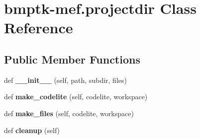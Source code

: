 \hypertarget{classbmptk-mef_1_1projectdir}{}\section{bmptk-\/mef.projectdir Class Reference}
\label{classbmptk-mef_1_1projectdir}
\subsection*{Public Member Functions}
\begin{DoxyCompactItemize}
\item 
def {\bfseries \+\_\+\+\_\+init\+\_\+\+\_\+} (self, path, subdir, files)\hypertarget{classbmptk-mef_1_1projectdir_a64e46a65f477fdb91b35aef0357e2885}{}\label{classbmptk-mef_1_1projectdir_a64e46a65f477fdb91b35aef0357e2885}

\item 
def {\bfseries make\+\_\+codelite} (self, codelite, workspace)\hypertarget{classbmptk-mef_1_1projectdir_ab300a09a81fa38eac3f4337f40c65a54}{}\label{classbmptk-mef_1_1projectdir_ab300a09a81fa38eac3f4337f40c65a54}

\item 
def {\bfseries make\+\_\+files} (self, codelite, workspace)\hypertarget{classbmptk-mef_1_1projectdir_a9c2346bb66c7b587cae4083d42bf1922}{}\label{classbmptk-mef_1_1projectdir_a9c2346bb66c7b587cae4083d42bf1922}

\item 
def {\bfseries cleanup} (self)\hypertarget{classbmptk-mef_1_1projectdir_ae289a43411d3740cf6378dd8323c34bd}{}\label{classbmptk-mef_1_1projectdir_ae289a43411d3740cf6378dd8323c34bd}

\end{DoxyCompactItemize}
